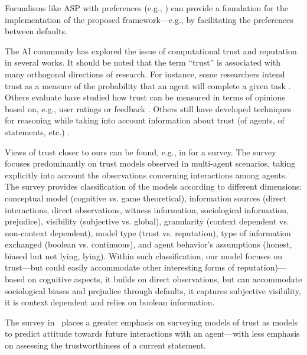 \documentclass{article}
\begin{document}
Formalisms like ASP with preferences (e.g., \cite{Brewka05,BrewkaDRS15})  can provide a foundation for the implementation of the proposed framework---e.g., by 
facilitating the preferences between defaults.


The AI community has explored the issue of computational trust and reputation in several works. It should be noted that the term ``trust'' is associated with many orthogonal directions of research. For instance, some researchers intend trust as a measure of the probability that an agent will complete a given task \cite{pg19}. Others evaluate have studied how trust can be measured in terms of opinions based on, e.g., user ratings or feedback \cite{dbq20}. Others still have developed techniques for reasoning while taking into account information about trust (of agents, of statements, etc.) \cite{tcm12}.  

Views of trust closer to ours can be found, e.g., in \cite{SabaterS05} for a survey. The survey focuses predominantly on trust models observed in multi-agent scenarios, taking explicitly into account the observations concerning interactions among agents. The survey provides classification of the models according to different dimensions: conceptual model (cognitive vs. game theoretical), information sources (direct interactions, direct observations, witness information, sociological information, prejudice), visibility (subjective vs. global), granularity (context dependent vs. non-context dependent), model type (trust vs. reputation), type of information exchanged (boolean vs. continuous), and agent behavior's assumptions (honest, biased but not lying, lying). Within such classification, our model focuses on trust---but could easily accommodate other interesting forms of reputation)---based on cognitive aspects, it builds on direct observations, but can accommodate sociological biases and prejudice through defaults, it captures subjective visibility, it is context dependent and relies on boolean information.
 
The survey in~\cite{ArtzG07} places a greater emphasis on surveying models of trust as models to predict attitude towards future interactions with an agent---with less emphasis on assessing the trustworthiness of a current statement.  
\end{document}
